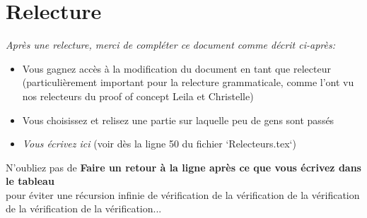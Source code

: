 \documentclass[a4paper,landscape,margin=1cm]{article}
\begin{document}
\section*{Relecture}
\textit{Après une relecture, merci de compléter ce document comme décrit ci-après:}
\begin{itemize}
    \item Vous gagnez accès à la modification du document en tant que relecteur (particulièrement important pour la relecture grammaticale, comme l'ont vu nos relecteurs du proof of concept Leila et Christelle)
    \item Vous choisissez et relisez une partie sur laquelle peu de gens sont passés
    \item \textit{Vous écrivez ici} (voir dès la ligne 50 du fichier `Relecteurs.tex`)
\end{itemize}
N'oubliez pas de \textbf{Faire un retour à la ligne après ce que vous écrivez dans le tableau}\\
 pour éviter une récursion infinie de vérification de la vérification de la vérification de la vérification de la vérification...
\end{document}
